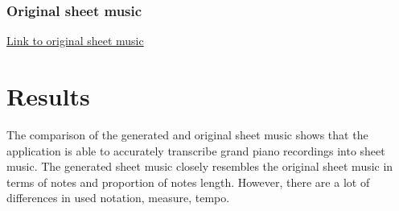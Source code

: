 \documentclass{article}
\begin{document}
\subsubsection{Original sheet music}
\hyperref[fig:original_pathetique]{Link to original sheet music}


\clearpage
\begin{figure}[htbp]
    \centering
    \label{fig:generated_chopin}
    
\end{figure}

\clearpage
\begin{figure}[htbp]
    \centering
    \label{fig:original_chopin}
    
\end{figure}

\clearpage
\begin{figure}[htbp]
    \centering
    \label{fig:generated_waldstein}
    
\end{figure}

\clearpage
\begin{figure}[htbp]
    \centering
    \label{fig:original_waldstein}
    
\end{figure}

\clearpage
\begin{figure}[htbp]
    \centering
    \label{fig:generated_pathetique}
    
\end{figure}

\clearpage
\begin{figure}[htbp]
    \centering
    \label{fig:original_pathetique}
    
\end{figure}




\FloatBarrier
\clearpage
\section{Results}

The comparison of the generated and original sheet music shows that the application is able to accurately transcribe grand piano recordings into sheet music. The generated sheet music closely resembles the original sheet music in terms of notes and proportion of notes length. However, there are a lot of differences in used notation, measure, tempo.
\end{document}
